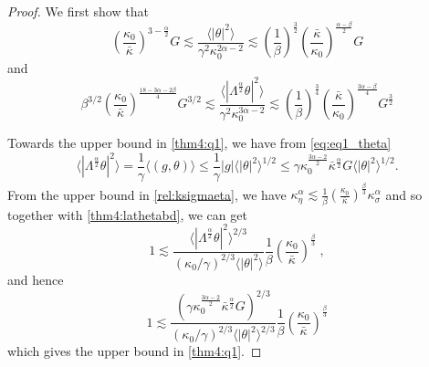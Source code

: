 \documentclass[twoside, reqno]{amsart}
\numberwithin{lemma}{section}
\numberwithin{theorem}{section}
\numberwithin{proposition}{section}
\numberwithin{equation}{section} %
\newcommand{\te}{\theta}
\newcommand{\ga}{\gamma}
\newcommand{\la}{\Lambda}
\newcommand{\ka}{\kappa}
\newcommand{\al}{\alpha}
\begin{document}
\begin{proof}
We first show that
\begin{equation} \label{thm4:q1}
    \left(\frac{\ka_0}{\bar{\ka}}\right)^{3-\frac{\al}{2}} G \lesssim \frac{\langle |\te|^2 \rangle}{\ga^2 \ka_0^{2\al-2}} \lesssim \left(\frac{1}{\beta}\right)^{\frac{3}{2}} \left(\frac{\bar{\ka}}{\ka_0}\right)^{\frac{\al-\beta}{2}} G 
\end{equation}
and
\begin{equation} \label{thm4:q2}
    \beta^{3/2} \left(\frac{\ka_0}{\bar{\ka}}\right)^{\frac{18-3\al-2\beta}{4}} G^{3/2} \lesssim \frac{\langle |\la^{\frac{\al}{2}}\te|^2 \rangle}{\ga^2 \ka_0^{3\al-2}} \lesssim \left(\frac{1}{\beta}\right)^{\frac{3}{4}} \left(\frac{\bar{\ka}}{\ka_0}\right)^{\frac{3\al-\beta}{4}} G^{\frac{3}{2}}
\end{equation}

Towards the upper bound in \eqref{thm4:q1}, we have from \eqref{eq:eq1_theta}
\begin{equation} \label{thm4:lathetabd}
    \langle |\la^{\frac{\al}{2}}\te|^2 \rangle = \frac{1}{\ga} \langle (g,\te) \rangle \le \frac{1}{\ga} |g| \langle |\te|^2 \rangle^{1/2} \le \ga \ka_0^{\frac{3\alpha-2}{2}} \bar{\ka}^{\frac{\alpha}{2}} G\langle |\te|^2 \rangle^{1/2} .
\end{equation}
From the upper bound in \eqref{rel:ksigmaeta}, we have $\kappa_\eta^{\alpha} \lesssim \frac{1}{\beta} \left(\frac{\ka_0}{\bar{\ka}}\right)^{\frac{\beta}{3}} \kappa_\sigma^{\alpha}$ and so together with \eqref{thm4:lathetabd}, we can get
\begin{equation} \label{thm4:sim1}
    1 \lesssim \frac{\langle |\la^{\frac{\al}{2}}\te|^2 \rangle^{2/3}}{(\ka_0/\ga)^{2/3}\langle |\te|^2 \rangle} \frac{1}{\beta} \left(\frac{\ka_0}{\bar{\ka}}\right)^{\frac{\beta}{3}} \;,
\end{equation}
and hence
\begin{equation} \label{thm4:al_bd}
 1 \lesssim \frac{(\ga \ka_0^{\frac{3\alpha-2}{2}} \bar{\ka}^{\frac{\alpha}{2}} G)^{2/3}}{(\ka_0/\ga)^{2/3}\langle |\te|^2 \rangle ^ {2/3}} \frac{1}{\beta} \left(\frac{\ka_0}{\bar{\ka}}\right)^{\frac{\beta}{3}}
\end{equation}which gives the upper bound in \eqref{thm4:q1}. 



\end{proof}
\end{document}
